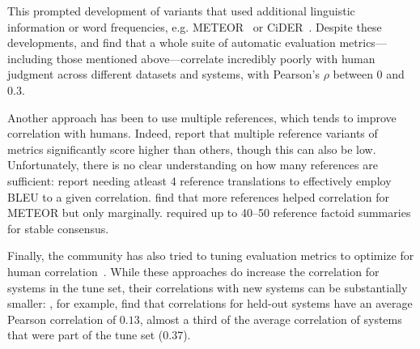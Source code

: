 This prompted development of variants that used additional linguistic information or word frequencies, e.g. METEOR~\citep{lavie2009meteor,denkowski2014meteor} or CiDER~\citep{vedantam2015cider}.
Despite these developments, \citet{liu2016evaluate} and \citet{novikova2017why} find that a whole suite of automatic evaluation metrics---including those mentioned above---correlate incredibly poorly with human judgment across different datasets and systems, with Pearson's $\rho$ between $0$ and $0.3$.

Another approach has been to use multiple references, which tends to improve correlation with humans.
Indeed, \citet{toutanova2016dataset} report that multiple reference variants of metrics significantly score higher than others, though this can also be low.
Unfortunately, there is no clear understanding on how many references are sufficient: 
  \citet{culy2003limits} report needing atleast 4 reference translations to effectively employ BLEU to a given correlation.
  \citet{lavie2009meteor} find that more references helped correlation for METEOR but only marginally.
\citet{vanhalteren2003factoid} required up to 40--50 reference factoid summaries for stable consensus.

Finally, the community has also tried to tuning evaluation metrics to optimize for human correlation~\citep{lavie2009meteor,denkowski2014meteor,lowe2017towards}.
While these approaches do increase the correlation for systems in the tune set, their correlations with new systems can be substantially smaller: \citet{lowe2017towards}, for example, find that correlations for held-out systems have an average Pearson correlation of $0.13$, almost a third of the average correlation of systems that were part of the tune set ($0.37$).

